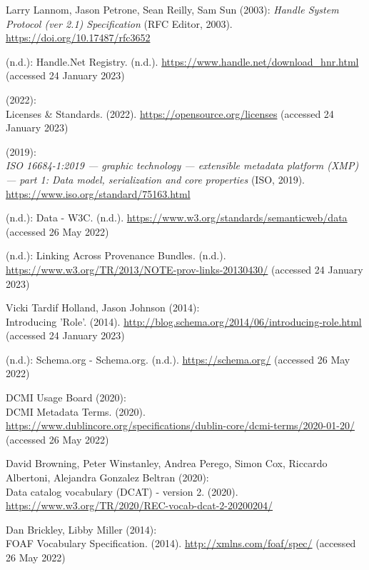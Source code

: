 \begin{thebibliography}{9}
{
Larry Lannom, Jason Petrone, Sean Reilly, Sam Sun (2003):
\emph{Handle {System Protocol} (ver 2.1) {Specification}} ({RFC Editor},
2003).
\url{https://doi.org/10.17487/rfc3652}

(n.d.): Handle.{Net Registry}. (n.d.).
\url{https://www.handle.net/download_hnr.html} (accessed 24 January
2023)

(2022): \\
Licenses \& {Standards}. (2022).
\url{https://opensource.org/licenses} (accessed 24 January 2023)

(2019): \\
\emph{{ISO} 16684-1:2019 --- graphic technology --- extensible
metadata platform (XMP) --- part 1: Data model, serialization and core
properties} ({ISO}, 2019). \url{https://www.iso.org/standard/75163.html}

(n.d.): Data - {W3C}. (n.d.).
\url{https://www.w3.org/standards/semanticweb/data} (accessed 26 May
2022)

(n.d.): Linking {Across Provenance Bundles}. (n.d.).
\url{https://www.w3.org/TR/2013/NOTE-prov-links-20130430/} (accessed 24
January 2023)

Vicki Tardif Holland, Jason Johnson (2014): \\
Introducing '{Role}'.
(2014). \url{http://blog.schema.org/2014/06/introducing-role.html}
(accessed 24 January 2023)

(n.d.): Schema.org - {Schema}.org. (n.d.). \url{https://schema.org/}
(accessed 26 May 2022)

DCMI Usage Board (2020): \\
{DCMI Metadata Terms}. (2020).
\url{https://www.dublincore.org/specifications/dublin-core/dcmi-terms/2020-01-20/}
(accessed 26 May 2022)

David Browning, Peter Winstanley, Andrea Perego, Simon Cox, Riccardo
Albertoni, Alejandra Gonzalez Beltran (2020): \\
Data catalog vocabulary
({DCAT}) - version 2. (2020).
\url{https://www.w3.org/TR/2020/REC-vocab-dcat-2-20200204/}

Dan Brickley, Libby Miller (2014): \\
{FOAF Vocabulary Specification}.
(2014). \url{http://xmlns.com/foaf/spec/} (accessed 26 May 2022)

}
\end{thebibliography}

